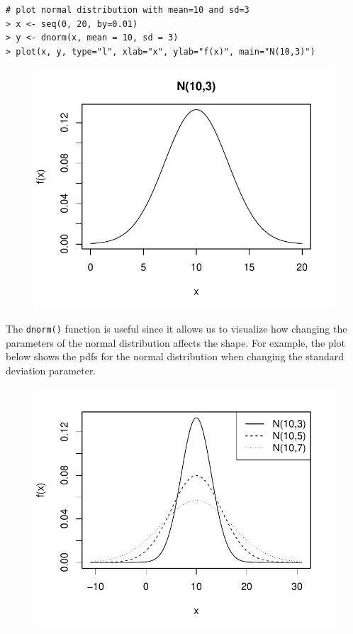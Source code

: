 \documentclass[10pt]{beamer}
\begin{document}
\begin{frame}[fragile]
\small
\begin{verbatim}
# plot normal distribution with mean=10 and sd=3
> x <- seq(0, 20, by=0.01)
> y <- dnorm(x, mean = 10, sd = 3)
> plot(x, y, type="l", xlab="x", ylab="f(x)", main="N(10,3)")
\end{verbatim}

\begin{figure}[htbp]
\centering
\includegraphics[scale=0.4]{figure/dnorm1.pdf}
\end{figure}
\end{frame}

\begin{frame}[fragile]
The \texttt{dnorm()} function is useful since it allows us to visualize how changing the parameters of the normal distribution affects the shape.  For example, the plot below shows the pdfs for the normal distribution when changing the standard deviation parameter.
\begin{figure}[htbp]
\centering
\includegraphics[scale=0.5]{figure/dnorm_sds.pdf}
\end{figure}
\end{frame}
\end{document}
